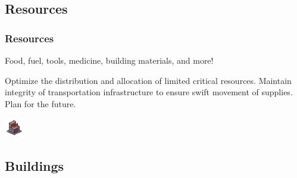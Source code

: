 \documentclass[ascpectratio=169]{beamer}
\begin{document}

\subsection{Resources}


\begin{frame}

  \frametitle{Resources}

  \begin{center}
    {\large Food, fuel, tools, medicine, building materials, and more!}
  \end{center}

  \begin{outline}
    \1 Optimize the distribution and allocation of limited critical resources.
    \1 Maintain integrity of transportation infrastructure to ensure swift
    movement of supplies.
    \1 Plan for the future.
  \end{outline}
  
  \begin{center}
    \includegraphics[scale=3.0]{../../Images/factory.png}
  \end{center}

\end{frame}


\subsection{Buildings}

\end{document}
